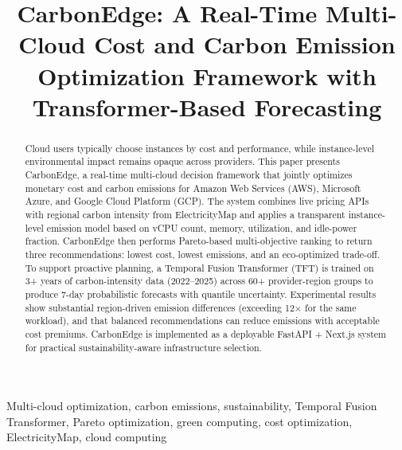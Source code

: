 \documentclass[conference]{IEEEtran}
\begin{document}
\title{CarbonEdge: A Real-Time Multi-Cloud Cost and Carbon Emission Optimization Framework with Transformer-Based Forecasting\\
}

\author{
}

\maketitle

\begin{abstract}
Cloud users typically choose instances by cost and performance, while instance-level environmental impact remains opaque across providers. This paper presents CarbonEdge, a real-time multi-cloud decision framework that jointly optimizes monetary cost and carbon emissions for Amazon Web Services (AWS), Microsoft Azure, and Google Cloud Platform (GCP). The system combines live pricing APIs with regional carbon intensity from ElectricityMap and applies a transparent instance-level emission model based on vCPU count, memory, utilization, and idle-power fraction. CarbonEdge then performs Pareto-based multi-objective ranking to return three recommendations: lowest cost, lowest emissions, and an eco-optimized trade-off. To support proactive planning, a Temporal Fusion Transformer (TFT) is trained on 3+ years of carbon-intensity data (2022--2025) across 60+ provider-region groups to produce 7-day probabilistic forecasts with quantile uncertainty. Experimental results show substantial region-driven emission differences (exceeding 12\(\times\) for the same workload), and that balanced recommendations can reduce emissions with acceptable cost premiums. CarbonEdge is implemented as a deployable FastAPI + Next.js system for practical sustainability-aware infrastructure selection.
\end{abstract}

\begin{IEEEkeywords}
Multi-cloud optimization, carbon emissions, sustainability, Temporal Fusion Transformer, Pareto optimization, green computing, cost optimization, ElectricityMap, cloud computing
\end{IEEEkeywords}

\end{document}
